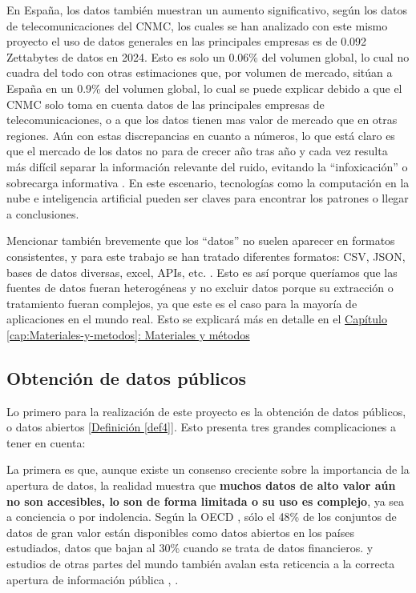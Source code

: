 En España, los datos también muestran un aumento significativo, según los datos de telecomunicaciones del CNMC, los cuales se han analizado con este mismo proyecto \citep{DatosGeneralesCNMC} el uso de datos generales en las principales empresas es de 0.092 Zettabytes de datos en 2024. %
Esto es solo un 0.06\% del volumen global, lo cual no cuadra del todo con otras estimaciones \citep{DatosMercadosEspanna} que, por volumen de mercado, sitúan a España en un 0.9\% del volumen global, lo cual se puede explicar debido a que el CNMC solo toma en cuenta datos de las principales empresas de telecomunicaciones, o a que los datos tienen mas valor de mercado que en otras regiones. 
Aún con estas discrepancias en cuanto a números, lo que está claro es que el mercado de los datos no para de crecer año tras año y cada vez resulta más difícil separar la información relevante del ruido, evitando la ``infoxicación'' o sobrecarga informativa \citep{Infoxicacion}. En este escenario, tecnologías como la computación en la nube e inteligencia artificial pueden ser claves para encontrar los patrones o llegar a conclusiones.

Mencionar también brevemente que los ``datos'' no suelen aparecer en formatos consistentes, y para este trabajo se han tratado diferentes formatos: CSV, JSON, bases de datos diversas, excel, APIs, etc. \citep{khan2019fileFormats}. Esto es así porque queríamos que las fuentes de datos fueran heterogéneas y no excluir datos porque su extracción o tratamiento fueran complejos, ya que este es el caso para la mayoría de aplicaciones en el mundo real. Esto se explicará más en detalle en el \hyperref[cap:Materiales-y-metodos]{Capítulo \ref*{cap:Materiales-y-metodos}: Materiales y métodos} \\ %


\subsection{Obtención de datos públicos}
	
	Lo primero para la realización de este proyecto es la obtención de datos públicos, o datos abiertos \hyperref[def4]{[Definición \ref*{def4}]}. Esto presenta tres grandes complicaciones a tener en cuenta:
	
	La primera es que, aunque existe un consenso creciente sobre la importancia de la apertura de datos, la realidad muestra que \textbf{muchos datos de alto valor aún no son accesibles, lo son de forma limitada o su uso es complejo}, ya sea a conciencia o por indolencia. Según la OECD \citep{OECD2023openData}, sólo el 48\% de los conjuntos de datos de gran valor están disponibles como datos abiertos en los países estudiados, datos que bajan al 30\% cuando se trata de datos financieros. y estudios de otras partes del mundo también avalan esta reticencia a la correcta apertura de información pública \citep{TransparenciaEcuador}, \citep{TransparenciaMexico}.
	
